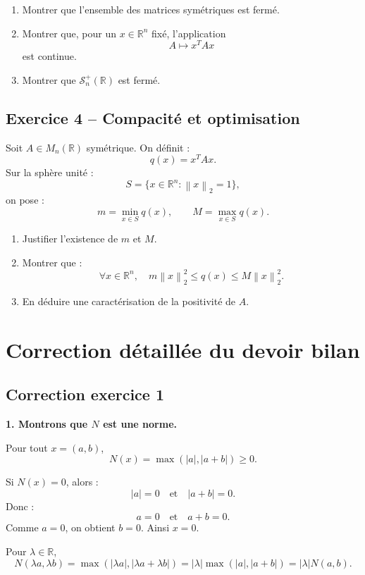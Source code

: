 \documentclass[11pt,a4paper]{article}
\newcommand{\R}{\mathbb R}
\newcommand{\norme}[1]{\left\lVert #1 \right\rVert}
\begin{document}
\begin{enumerate}
    \item Montrer que l'ensemble des matrices symétriques est fermé.
    \item Montrer que, pour un \(x\in\R^n\) fixé, l'application
    \[
    A\mapsto x^TAx
    \]
    est continue.
    \item Montrer que \(\mathcal S_n^+(\R)\) est fermé.
\end{enumerate}

\subsection*{Exercice 4 -- Compacité et optimisation}

Soit \(A\in M_n(\R)\) symétrique. On définit :
\[
q(x)=x^TAx.
\]
Sur la sphère unité :
\[
S=\{x\in\R^n:\norme{x}_2=1\},
\]
on pose :
\[
m=\min_{x\in S}q(x),
\qquad
M=\max_{x\in S}q(x).
\]

\begin{enumerate}
    \item Justifier l'existence de \(m\) et \(M\).
    \item Montrer que :
    \[
    \forall x\in\R^n,\quad m\norme{x}_2^2\leq q(x)\leq M\norme{x}_2^2.
    \]
    \item En déduire une caractérisation de la positivité de \(A\).
\end{enumerate}

\newpage

\section{Correction détaillée du devoir bilan}

\subsection*{Correction exercice 1}

\textbf{1. Montrons que \(N\) est une norme.}

Pour tout \(x=(a,b)\),
\[
N(x)=\max(|a|,|a+b|)\geq0.
\]

Si \(N(x)=0\), alors :
\[
|a|=0
\quad\text{et}\quad
|a+b|=0.
\]
Donc :
\[
a=0
\quad\text{et}\quad
a+b=0.
\]
Comme \(a=0\), on obtient \(b=0\).  
Ainsi \(x=0\).

Pour \(\lambda\in\R\),
\[
N(\lambda a,\lambda b)
=\max(|\lambda a|,|\lambda a+\lambda b|)
=|\lambda|\max(|a|,|a+b|)
=|\lambda|N(a,b).
\]
\end{document}
